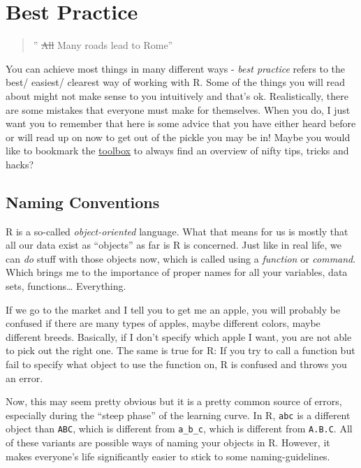 \documentclass[
]{book}
\begin{document}
\chapter{Best Practice}\label{best-practice}

\begin{quote}
'' \st{All} Many roads lead to Rome''
\end{quote}

You can achieve most things in many different ways - \emph{best practice} refers to the best/ easiest/ clearest way of working with R.
Some of the things you will read about might not make sense to you intuitively and that's ok.
Realistically, there are some mistakes that everyone must make for themselves.
When you do, I just want you to remember that here is some advice that you have either heard before or will read up on now to get out of the pickle you may be in!
Maybe you would like to bookmark the \hyperref[toolbox]{toolbox} to always find an overview of nifty tips, tricks and hacks?

\section{Naming Conventions}\label{varnames}

R is a so-called \emph{object-oriented} language.
What that means for us is mostly that all our data exist as ``objects'' as far is R is concerned.
Just like in real life, we can \emph{do} stuff with those objects now, which is called using a \emph{function} or \emph{command}.
Which brings me to the importance of proper names for all your variables, data sets, functions\ldots{}
Everything.

If we go to the market and I tell you to get me an apple, you will probably be confused if there are many types of apples, maybe different colors, maybe different breeds.
Basically, if I don't specify which apple I want, you are not able to pick out the right one.
The same is true for R: If you try to call a function but fail to specify what object to use the function on, R is confused and throws you an error.

Now, this may seem pretty obvious but it is a pretty common source of errors, especially during the ``steep phase'' of the learning curve.
In R, \texttt{abc} is a different object than \texttt{ABC}, which is different from \texttt{a\_b\_c}, which is different from \texttt{A.B.C}. All of these variants are possible ways of naming your objects in R.
However, it makes everyone's life significantly easier to stick to some naming-guidelines.
\end{document}
